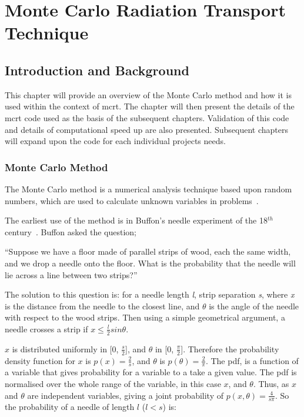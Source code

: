 \chapter{Monte Carlo Radiation Transport Technique}
\label{sec:mcrt}
\section{Introduction and Background}
This chapter will provide an overview of the Monte Carlo method and how it is used within the context of \gls*{mcrt}. The chapter will then present the details of the \gls*{mcrt} code used as the basis of the subsequent chapters. Validation of this code and details of computational speed up are also presented. Subsequent chapters will expand upon the code for each individual projects needs.

\subsection*{Monte Carlo Method}\label{sec:mcmethod}
The Monte Carlo method is a numerical analysis technique based upon random numbers, which are used to calculate unknown variables in problems~\cite{cashwell1959practical,rogers1990monte}. 

The earliest use of the method is in Buffon's needle experiment of the 18$^{th}$ century~\cite{badger1994lazzarini,beckmann2015history,buffon1785histoire}. Buffon asked the question;

\medskip

``Suppose we have a floor made of parallel strips of wood, each the same width, and we drop a needle onto the floor. What is the probability that the needle will lie across a line between two strips?''

\medskip

The solution to this question is:
for a needle length \textit{l}, strip separation \textit{s}, where \textit{x} is the distance from the needle to the closest line, and $\theta$ is the angle of the needle with respect to the wood strips. Then using a simple geometrical argument, a needle crosses a strip if $x \leq \tfrac{l}{2} sin \theta$.

$x$ is distributed uniformly in [0, $\tfrac{s}{2}$], and $\theta$ in [0, $\tfrac{\pi}{2}$]. Therefore the probability density function for $x$ is $p(x)=\tfrac{2}{s}$, and $\theta$ is $p(\theta) = \tfrac{2}{\pi}$. The \gls*{pdf}, is a function of a variable that gives probability for a variable to a take a given value. The \gls*{pdf} is normalised over the whole range of the variable, in this case $x$, and $\theta$.
Thus, as $x$ and $\theta$ are independent variables, giving a joint probability of $p(x,\theta) = \tfrac{4}{s \pi}$.
So the probability of a needle of length $l$ ($l<s$) is:

